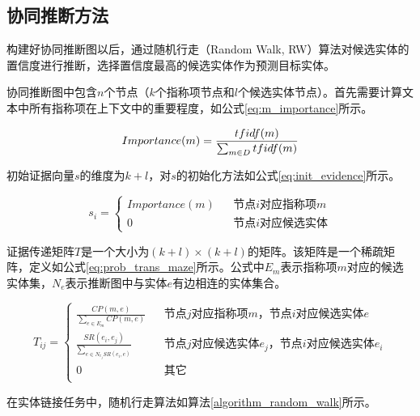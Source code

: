 \subsection{协同推断方法}\label{section:collective_infer_method}
构建好协同推断图以后，通过随机行走（Random Walk, RW）算法\cite{tong2006fast}对候选实体的置信度进行推断，选择置信度最高的候选实体作为预测目标实体。

协同推断图中包含$n$个节点（$k$个指称项节点和$l$个候选实体节点）。首先需要计算文本中所有指称项在上下文中的重要程度，如公式\ref{eq:m_importance}所示。

\begin{equation}\label{eq:m_importance}
Importance(m)=\frac{tfidf(m)}{\sum_{m\in D} tfidf(m)}\\
\end{equation}

初始证据向量$s$的维度为$k+l$，对$s$的初始化方法如公式\ref{eq:init_evidence}所示。

\begin{equation}\label{eq:init_evidence}
s_i=\left\{
\begin{array}{rcl}
Importance(m)       &      & {\text{节点}i\text{对应指称项}m}\\
0    &      & {\text{节点}i\text{对应候选实体}}
\end{array} \right.
\end{equation}

证据传递矩阵$T$是一个大小为$(k+l)\times (k+l)$的矩阵。该矩阵是一个稀疏矩阵，定义如公式\ref{eq:prob_trans_maze}所示。公式中$E_m$表示指称项$m$对应的候选实体集，$N_e$表示推断图中与实体$e$有边相连的实体集合。

\begin{equation}\label{eq:prob_trans_maze}
T_{ij}=\left\{
\begin{array}{rcl}
\frac{CP(m,e)}{\sum_{e\in E_m} CP(m,e)}       &      & {\text{节点}j\text{对应指称项}m\text{，节点}i\text{对应候选实体}e}\\
\frac{SR(e_i,e_j)}{\sum_{e\in N_{e_j} SR(e_i,e)}}    &      &{\text{节点}j\text{对应候选实体}e_j\text{，节点}i\text{对应候选实体}e_i}\\
0    &      &{\text{其它}}\\
\end{array} \right.
\end{equation}

在实体链接任务中，随机行走算法如算法\ref{algorithm_random_walk}所示。

